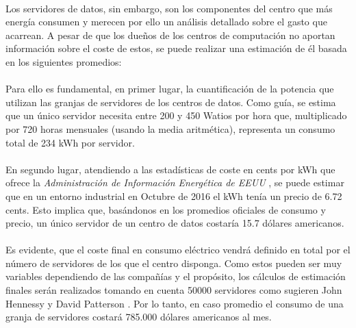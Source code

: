 \documentclass[12pt]{article}
\begin{document}
            \paragraph{}
            Los servidores de datos, sin embargo, son los componentes del centro que más energía consumen y merecen por ello un análisis detallado sobre el gasto que acarrean. A pesar de que los dueños de los centros de computación no aportan información sobre el coste de estos, se puede realizar una estimación de él basada en los siguientes promedios: \cite{datacenters:consumo}
            
            \paragraph{}
            Para ello es fundamental, en primer lugar, la cuantificación de la potencia que utilizan las granjas de servidores de los centros de datos. Como guía, se estima que un único servidor necesita entre 200 y 450 Watios por hora que, multiplicado por 720 horas mensuales (usando la media aritmética), representa un consumo total de 234 kWh por servidor.
            
            \paragraph{}
            En segundo lugar, atendiendo a las estadísticas de coste en cents por kWh que ofrece la \textit{Administración de Información Energética de EEUU} \cite{eia:consumo}, se puede estimar que en un entorno industrial en Octubre de 2016 el kWh tenía un precio de 6.72 cents. Esto implica que, basándonos en los promedios oficiales de consumo y precio, un único servidor de un centro de datos costaría 15.7 dólares americanos.
            
            \paragraph{}
            Es evidente, que el coste final en consumo eléctrico vendrá definido en total por el número de servidores de los que el centro disponga. Como estos pueden ser muy variables dependiendo de las compañías y el propósito, los cálculos de estimación finales serán realizados tomando en cuenta 50000 servidores como sugieren John Hennessy y David Patterson  \cite{hp:com-arch}. Por lo tanto, en caso promedio el consumo de una granja de servidores costará 785.000 dólares americanos al mes.
            
\end{document}

